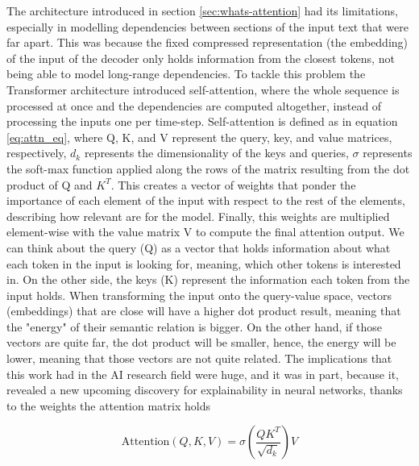 The architecture introduced in section \ref{sec:whats-attention} had its limitations, especially in modelling dependencies between sections of the input text that were far apart. This was because the fixed compressed representation (the embedding) of the input of the decoder only holds information from the closest tokens, not being able to model long-range dependencies. To tackle this problem the Transformer architecture  \cite{vaswani2023attention} introduced self-attention, where the whole sequence is processed at once and the dependencies are computed altogether, instead of processing the inputs one per time-step. Self-attention is defined as in equation \ref{eq:attn_eq}, where Q, K, and V represent the query, key, and value matrices, respectively, $d_k$ represents the dimensionality of the keys and queries, $\sigma$ represents the soft-max function applied along the rows of the matrix resulting from the dot product of Q and $K^T$. This creates a vector of weights that ponder the importance of each element of the input with respect to the rest of the elements, describing how relevant are for the model. Finally, this weights are multiplied element-wise with the value matrix V to compute the final attention output. We can think about the query (Q) as a vector that holds information about what each token in the input is looking for, meaning, which other tokens is interested in. On the other side, the keys (K) represent the information each token from the input holds. When transforming the input onto the query-value space, vectors (embeddings) that are close will have a higher dot product result, meaning that the "energy" of their semantic relation is bigger. On the other hand, if those vectors are quite far, the dot product will be smaller, hence, the energy will be lower, meaning that those vectors are not quite related. The implications that this work had in the AI research field were huge, and it was in part, because it, revealed a new upcoming discovery for explainability in neural networks, thanks to the weights the attention matrix holds

\begin{equation} \label{eq:attn_eq}
	\text{Attention}(Q,K,V) = \text{$\sigma$}\left(\frac{QK^T}{\sqrt{d_k}}\right)V
\end{equation}

